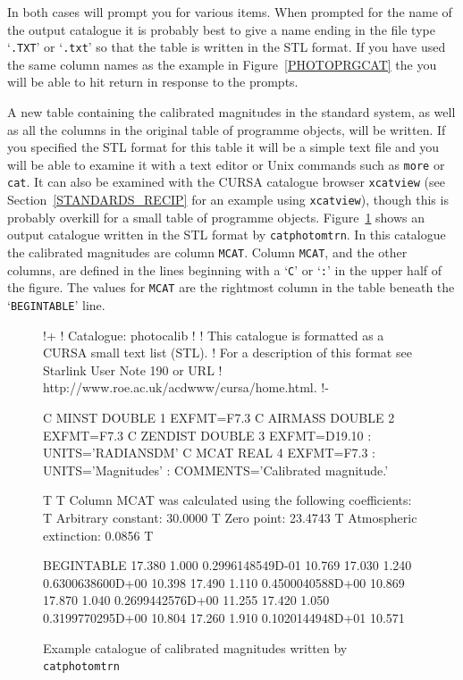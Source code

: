\documentclass[twoside,11pt,nolof]{starlink}
\begin{document}
\begin{enumerate}
   In both cases  will
   prompt you for various items.  When prompted for the name of the
   output catalogue it is probably best to give a name ending in the file
   type `\texttt{.TXT}' or `\texttt{.txt}' so that the table is written in the
   STL format.  If you have used the same column names as the example in
   Figure~\ref{PHOTOPRGCAT} the you will be able to hit return in response
   to the prompts.

   A new table containing the calibrated magnitudes in the standard
   system, as well as all the columns in the original table of
   programme objects, will be written.  If you specified the STL
   format for this table it will be a simple text file and you will
   be able to examine it with a text editor or Unix commands such
   as \texttt{more} or \texttt{cat}.  It can also be examined with the
   CURSA catalogue browser \texttt{xcatview} (see
   Section~\ref{STANDARDS_RECIP} for an example using \texttt{xcatview}),
   though this is probably overkill for a small table of programme
   objects.  Figure~\ref{PHOTOPRGOUT} shows an output catalogue written
   in the STL format by \texttt{catphotomtrn}.  In this catalogue the
   calibrated magnitudes are column \texttt{MCAT}.  Column \texttt{MCAT},
   and the other columns, are defined in the lines beginning with a
   `\texttt{C}' or `\texttt{:}' in the upper half of the figure.  The values
   for \texttt{MCAT} are the rightmost column in the table beneath the
   `\texttt{BEGINTABLE}' line.

\begin{figure}[htbp]

\begin{terminalv}
!+
!  Catalogue: photocalib
!
!  This catalogue is formatted as a CURSA small text list (STL).
!  For a description of this format see Starlink User Note 190 or URL
!  http://www.roe.ac.uk/acdwww/cursa/home.html.
!-

C  MINST    DOUBLE    1     EXFMT=F7.3
C  AIRMASS  DOUBLE    2     EXFMT=F7.3
C  ZENDIST  DOUBLE    3     EXFMT=D19.10
:    UNITS='RADIANS{DM}'
C  MCAT     REAL      4     EXFMT=F7.3
:    UNITS='Magnitudes'
:    COMMENTS='Calibrated magnitude.'

T
T Column MCAT was calculated using the following coefficients:
T    Arbitrary constant:        30.0000
T    Zero point:                23.4743
T    Atmospheric extinction:     0.0856
T


BEGINTABLE
 17.380    1.000     0.2996148549D-01   10.769
 17.030    1.240     0.6300638600D+00   10.398
 17.490    1.110     0.4500040588D+00   10.869
 17.870    1.040     0.2699442576D+00   11.255
 17.420    1.050     0.3199770295D+00   10.804
 17.260    1.910     0.1020144948D+01   10.571
\end{terminalv}

\begin{quote}
\caption{Example catalogue of calibrated magnitudes written by
\texttt{catphotomtrn}
\label{PHOTOPRGOUT} }
\end{quote}

\end{figure}


\end{enumerate}
\end{document}
